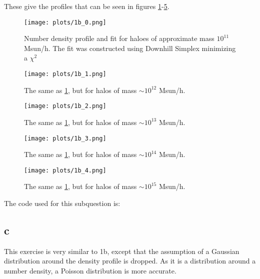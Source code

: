 These give the profiles that can be seen in figures \ref{fig:ex1b_0}-\ref{fig:ex1b_4}.
\begin{figure}
    \centering
    \texttt{[image: plots/1b\_0.png]}
    \caption{Number density profile and fit for haloes of approximate mass $10^{11}$ Msun/h. The fit was constructed using Downhill Simplex minimizing a $\chi^2$}
    \label{fig:ex1b_0}
\end{figure}
\begin{figure}
    \centering
    \texttt{[image: plots/1b\_1.png]}
    \caption{The same as \ref{fig:ex1b_0}, but for halos of mass $\sim 10^{12}$ Msun/h.}
    \label{fig:ex1b_1}
\end{figure}
\begin{figure}
    \centering
    \texttt{[image: plots/1b\_2.png]}
    \caption{The same as \ref{fig:ex1b_0}, but for halos of mass $\sim 10^{13}$ Msun/h.}
    \label{fig:ex1b_2}
\end{figure}
\begin{figure}
    \centering
    \texttt{[image: plots/1b\_3.png]}
    \caption{The same as \ref{fig:ex1b_0}, but for halos of mass $\sim 10^{14}$ Msun/h.}
    \label{fig:ex1b_3}
\end{figure}
\begin{figure}
    \centering
    \texttt{[image: plots/1b\_4.png]}
    \caption{The same as \ref{fig:ex1b_0}, but for halos of mass $\sim 10^{15}$ Msun/h.}
    \label{fig:ex1b_4}
\end{figure}

The code used for this subquestion is:


\subsection*{c}
This exercise is very similar to 1b, except that the assumption of a Gaussian distribution around the density profile is dropped.
As it is a distribution around a number density, a Poisson distribution is more accurate.

